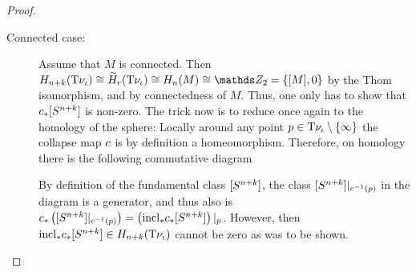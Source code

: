 \begin{Lem}
\begin{proof}
    \begin{description}
    \item[Connected case:]
      Assume that $M$ is connected.
      Then
      $\H_{n+k}(\Thomspace{\N{\emb}})
      \cong\relH_r(\Thomspace{\N{\emb}})
      \cong \H_n(M) \cong \Zmod2=\{\fundcl M, 0\}$ by
      the Thom isomorphism, and by connectedness of $M$.
      Thus, one only has to show that
      ${c}_*[S^{n+k}]$
      is non-zero.    
      The trick now is to reduce once again to the homology of the
      sphere:
      Locally around any point $p\in\mathrm{T}{\nu_{{\iota}}}\setminus\{\infty\}$ the
      collapse map $c$ is by definition a
      homeomorphism. Therefore, on homology there is the following 
      commutative diagram
      \begin{center}
      \end{center}
      By definition of the fundamental class $[S^{n+k}]$,
      the class $[S^{n+k}]|_{c^{-1}(p)}$ in the
      diagram is a generator, and thus also is
      ${c}_*\left([S^{n+k}]|_{c^{-1}(p)}\right)
      = \left({\mathrm{incl}}_*{c}_*[S^{n+k}]\right)|_p$.
      However, then ${\mathrm{incl}}_*{c}_*[S^{n+k}]\in
      H_{n+k}(\mathrm{T}{\nu_{{\iota}}})$
      cannot be zero as was to be shown.


\end{description}
\end{proof}
\end{Lem}
